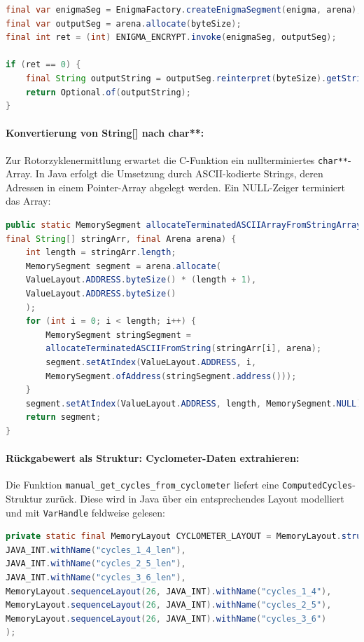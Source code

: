 \documentclass[12pt, ngerman, a4paper, numbers=noenddot]{article}
\begin{document}
\begin{lstlisting}[language=Java, caption={Aufruf der FFM-Funktion \lstinline|enigma_encrypt|}, label={lst:ffm-encrypt}]
final var enigmaSeg = EnigmaFactory.createEnigmaSegment(enigma, arena);
final var outputSeg = arena.allocate(byteSize);
final int ret = (int) ENIGMA_ENCRYPT.invoke(enigmaSeg, outputSeg);

if (ret == 0) {
	final String outputString = outputSeg.reinterpret(byteSize).getString(0);
	return Optional.of(outputString);
}
\end{lstlisting}

\newpage
\paragraph{Konvertierung von String[] nach char**:}
Zur Rotorzyklenermittlung erwartet die C-Funktion ein nullterminiertes \lstinline|char**|-Array. In Java erfolgt die Umsetzung durch ASCII-kodierte Strings, deren Adressen in einem Pointer-Array abgelegt werden. Ein NULL-Zeiger terminiert das Array:
\begin{lstlisting}[language=Java, caption=Konvertierung von String zu char**]
public static MemorySegment allocateTerminatedASCIIArrayFromStringArray(
final String[] stringArr, final Arena arena) {
	int length = stringArr.length;
	MemorySegment segment = arena.allocate(
	ValueLayout.ADDRESS.byteSize() * (length + 1),
	ValueLayout.ADDRESS.byteSize()
	);
	for (int i = 0; i < length; i++) {
		MemorySegment stringSegment = 
		allocateTerminatedASCIIFromString(stringArr[i], arena);
		segment.setAtIndex(ValueLayout.ADDRESS, i, 
		MemorySegment.ofAddress(stringSegment.address()));
	}
	segment.setAtIndex(ValueLayout.ADDRESS, length, MemorySegment.NULL);
	return segment;
}
\end{lstlisting}

\paragraph{Rückgabewert als Struktur: Cyclometer-Daten extrahieren:}
Die Funk\-tion \lstinline|manual_get_cycles_from_cyclometer| liefert eine \lstinline|ComputedCycles|-Struktur zurück. Diese wird in Java über ein entsprechendes Layout modelliert und mit \lstinline|VarHandle| feldweise gelesen:

\begin{lstlisting}[language=Java, caption=Layout des Rückgabewerts ComputedCycles]
private static final MemoryLayout CYCLOMETER_LAYOUT = MemoryLayout.structLayout(
JAVA_INT.withName("cycles_1_4_len"),
JAVA_INT.withName("cycles_2_5_len"),
JAVA_INT.withName("cycles_3_6_len"),
MemoryLayout.sequenceLayout(26, JAVA_INT).withName("cycles_1_4"),
MemoryLayout.sequenceLayout(26, JAVA_INT).withName("cycles_2_5"),
MemoryLayout.sequenceLayout(26, JAVA_INT).withName("cycles_3_6")
);
\end{lstlisting}
\end{document}
